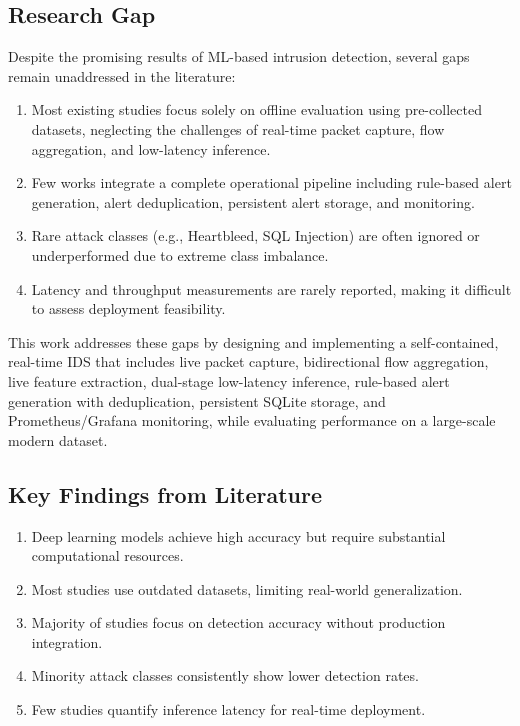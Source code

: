 \documentclass[12pt,a4paper]{article}
\begin{document}
\subsection{Research Gap}

Despite the promising results of ML-based intrusion detection, several gaps remain unaddressed in the literature:

\begin{enumerate}
    \item Most existing studies focus solely on offline evaluation using pre-collected datasets, neglecting the challenges of real-time packet capture, flow aggregation, and low-latency inference.
    \item Few works integrate a complete operational pipeline including rule-based alert generation, alert deduplication, persistent alert storage, and monitoring.
    \item Rare attack classes (e.g., Heartbleed, SQL Injection) are often ignored or underperformed due to extreme class imbalance.
    \item Latency and throughput measurements are rarely reported, making it difficult to assess deployment feasibility.
\end{enumerate}

This work addresses these gaps by designing and implementing a self-contained, real-time IDS that includes live packet capture, bidirectional flow aggregation, live feature extraction, dual-stage low-latency inference, rule-based alert generation with deduplication, persistent SQLite storage, and Prometheus/Grafana monitoring, while evaluating performance on a large-scale modern dataset.

\subsection{Key Findings from Literature}

\begin{enumerate}
    \item Deep learning models achieve high accuracy but require substantial computational resources.
    \item Most studies use outdated datasets, limiting real-world generalization.
    \item Majority of studies focus on detection accuracy without production integration.
    \item Minority attack classes consistently show lower detection rates.
    \item Few studies quantify inference latency for real-time deployment.
\end{enumerate}
\end{document}
